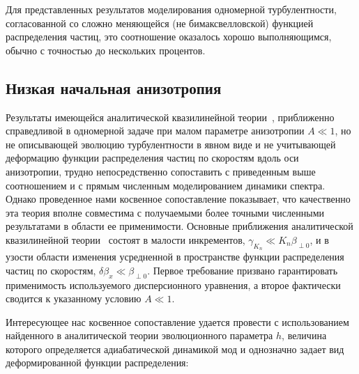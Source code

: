 Для представленных результатов моделирования одномерной турбулентности, согласованной со сложно меняющейся (не бимаксвелловской) функцией распределения частиц, это соотношение оказалось хорошо выполняющимся, обычно с точностью до нескольких процентов.
\subsection{Низкая начальная анизотропия}\label{subsec:low_A_1d}

Результаты имеющейся аналитической квазилинейной теории~\cite{Pokhotelov2011}, приближенно справедливой в одномерной задаче при малом параметре анизотропии $A\ll 1$, но не описывающей эволюцию турбулентности в явном виде и не учитывающей деформацию функции распределения частиц по скоростям вдоль оси анизотропии, трудно непосредственно сопоставить с приведенным выше соотношением и с прямым численным моделированием динамики спектра. Однако проведенное нами косвенное сопоставление показывает, что качественно эта теория вполне совместима с получаемыми более точными численными результатами в области ее применимости. Основные приближения аналитической квазилинейной теории~\cite{Pokhotelov2011} состоят в малости инкрементов, $\gamma_{K_n}\ll K_n\beta_{\perp0}$, и в узости области изменения усредненной в пространстве функции распределения частиц по скоростям, $\delta \beta_x\ll \beta_{\perp0}$. Первое требование призвано гарантировать применимость используемого дисперсионного уравнения, а второе фактически сводится к указанному условию $A\ll 1$. 

Интересующее нас косвенное сопоставление удается провести с использованием найденного в аналитической теории эволюционного параметра $h$, величина которого определяется адиабатической динамикой мод и однозначно задает вид деформированной функции распределения: 
 
